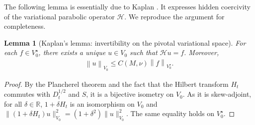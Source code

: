 \documentclass[11pt, letterpaper]{amsart}
\newtheorem{lem}[thm]{Lemma}
\theoremstyle{definition}
\theoremstyle{remark}
\numberwithin{equation}{section}
\begin{document}
{The following lemma is essentially due to Kaplan \cite{kaplan1966abstract}. It expresses hidden coercivity of the variational parabolic  operator $\mathcal{H}$. We reproduce the argument for completeness.
\begin{lem}[Kaplan's lemma: invertibility on the pivotal variational space]\label{lemme Hidden Coerc} 
    For each $f \in V_0^\star$, there exists a unique $u \in V_0$ such that $\mathcal{H}u=f$. Moreover, 
    \begin{align*}\label{!}
         \left \| u \right \|_{V_0} \leq C(M,\nu)
         \left \| f \right \|_{V_0^\star}.
    \end{align*}
\end{lem}
\begin{proof}
By the Plancherel theorem and the fact that the Hilbert transform $H_t$ commutes with $D_t^{1/2}$ and $S$,  it is a bijective isometry on $V_0$. As  it is skew-adjoint, for all $\delta \in \mathbb{R}$,  $1+\delta H_t$ is an isomorphism on $V_0$ and $\|(1+\delta H_t)u\|_{V_0}^2= (1+\delta^2)\|u\|^2_{V_0}$. The same equality holds on $V_0^\star$.


\end{proof}}
\end{document}
